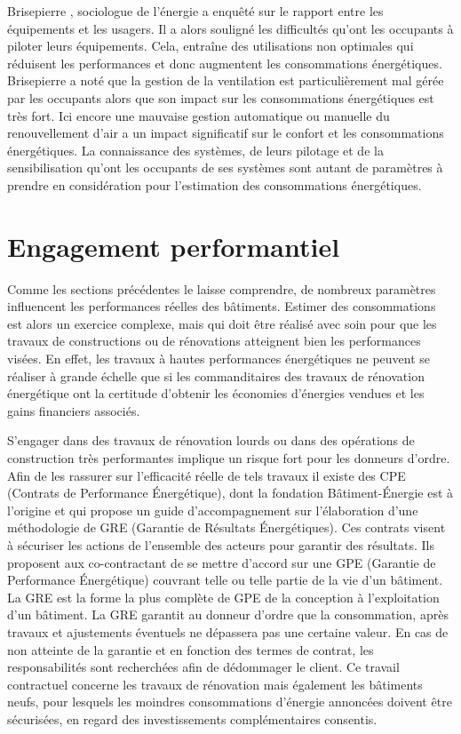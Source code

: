 Brisepierre \cite{Brisepierre-11}, sociologue de l'énergie a enquêté sur le rapport entre les équipements et les usagers. Il a alors souligné les difficultés qu'ont les occupants à piloter leurs équipements. Cela, entraîne des utilisations non optimales qui réduisent les performances et donc augmentent les consommations énergétiques. Brisepierre a noté que la gestion de la ventilation est particulièrement mal gérée par les occupants alors que son impact sur les consommations énergétiques est très fort. Ici encore une mauvaise gestion automatique ou manuelle du renouvellement d'air a un impact significatif sur le confort et les consommations énergétiques. La connaissance des systèmes, de leurs pilotage et de la sensibilisation qu'ont les occupants de ses systèmes sont autant de paramètres à prendre en considération pour l'estimation des consommations énergétiques. 

\section{Engagement performantiel}

Comme les sections précédentes le laisse comprendre, de nombreux paramètres influencent les performances réelles des bâtiments. Estimer des consommations est alors un exercice complexe, mais qui doit être réalisé avec soin pour que les travaux de constructions ou de rénovations atteignent bien les performances visées. En effet, les travaux à hautes performances énergétiques ne peuvent se réaliser à grande échelle que si les commanditaires des travaux de rénovation énergétique ont la certitude d'obtenir les économies d'énergies vendues et les gains financiers associés.

S'engager dans des travaux de rénovation lourds ou dans des opérations de construction très performantes implique un risque fort pour les donneurs d'ordre. Afin de les rassurer sur l'efficacité réelle de tels travaux il existe des CPE (Contrats de Performance Énergétique), dont la fondation Bâtiment-Énergie \cite{FBE-16} est à l'origine et qui propose un guide d'accompagnement sur l'élaboration d'une méthodologie de GRE (Garantie de Résultats Énergétiques). Ces contrats visent à sécuriser les actions de l'ensemble des acteurs pour garantir des résultats. Ils proposent aux co-contractant de se mettre d'accord sur une GPE (Garantie de Performance Énergétique) couvrant telle ou telle partie de la vie d'un bâtiment. La GRE est la forme la plus complète de GPE de la conception à l'exploitation d'un bâtiment. La GRE garantit au donneur d'ordre que la consommation, après travaux et ajustements éventuels ne dépassera pas une certaine valeur. En cas de non atteinte de la garantie et en fonction des termes de contrat, les responsabilités sont recherchées afin de dédommager le client. Ce travail contractuel concerne les travaux de rénovation mais également les bâtiments neufs, pour lesquels les moindres consommations d'énergie annoncées doivent être sécurisées, en regard des investissements complémentaires consentis.

